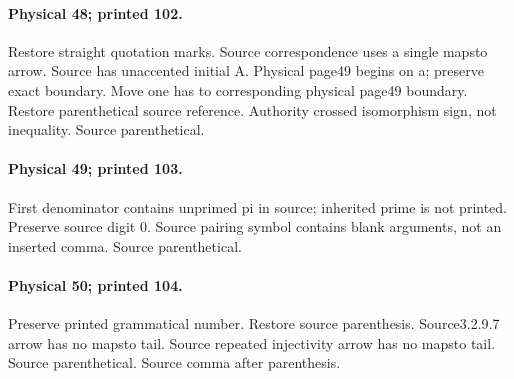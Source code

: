 \documentclass[10pt,a4paper]{article}
\begin{document}
\paragraph{Physical 48; printed 102.} Restore straight quotation marks. Source correspondence uses a single mapsto arrow. Source has unaccented initial A. Physical page49 begins on a; preserve exact boundary. Move one has to corresponding physical page49 boundary. Restore parenthetical source reference. Authority crossed isomorphism sign, not inequality. Source parenthetical.
\paragraph{Physical 49; printed 103.} First denominator contains unprimed pi in source; inherited prime is not printed. Preserve source digit 0. Source pairing symbol contains blank arguments, not an inserted comma. Source parenthetical.
\paragraph{Physical 50; printed 104.} Preserve printed grammatical number. Restore source parenthesis. Source3.2.9.7 arrow has no mapsto tail. Source repeated injectivity arrow has no mapsto tail. Source parenthetical. Source comma after parenthesis.
\end{document}
